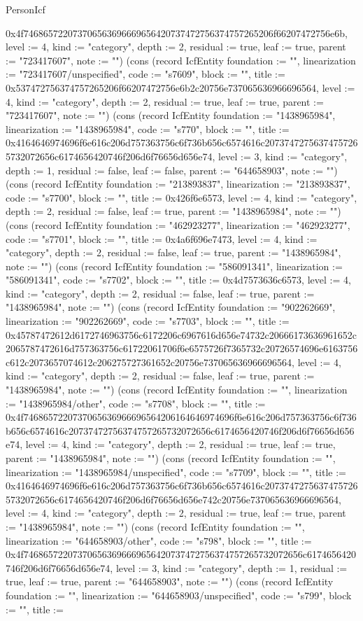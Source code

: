 \begin{lexlean}{PersonIcf}
\begin{semanticmodule}
{0x4f746865722073706563696669656420737472756374757265206f66207472756e6b, level := 4, kind := "category", depth := 2, residual := true, leaf := true, parent := "723417607", note := ""}) (cons (record IcfEntity {foundation := "", linearization := "723417607/unspecified", code := "s7609", block := "", title := 0x537472756374757265206f66207472756e6b2c20756e737065636966696564, level := 4, kind := "category", depth := 2, residual := true, leaf := true, parent := "723417607", note := ""}) (cons (record IcfEntity {foundation := "1438965984", linearization := "1438965984", code := "s770", block := "", title := 0x4164646974696f6e616c206d757363756c6f736b656c6574616c20737472756374757265732072656c6174656420746f206d6f76656d656e74, level := 3, kind := "category", depth := 1, residual := false, leaf := false, parent := "644658903", note := ""}) (cons (record IcfEntity {foundation := "213893837", linearization := "213893837", code := "s7700", block := "", title := 0x426f6e6573, level := 4, kind := "category", depth := 2, residual := false, leaf := true, parent := "1438965984", note := ""}) (cons (record IcfEntity {foundation := "462923277", linearization := "462923277", code := "s7701", block := "", title := 0x4a6f696e7473, level := 4, kind := "category", depth := 2, residual := false, leaf := true, parent := "1438965984", note := ""}) (cons (record IcfEntity {foundation := "586091341", linearization := "586091341", code := "s7702", block := "", title := 0x4d7573636c6573, level := 4, kind := "category", depth := 2, residual := false, leaf := true, parent := "1438965984", note := ""}) (cons (record IcfEntity {foundation := "902262669", linearization := "902262669", code := "s7703", block := "", title := 0x45787472612d6172746963756c6172206c6967616d656e74732c20666173636961652c2065787472616d757363756c61722061706f6e6575726f7365732c20726574696e6163756c612c2073657074612c206275727361652c20756e737065636966696564, level := 4, kind := "category", depth := 2, residual := false, leaf := true, parent := "1438965984", note := ""}) (cons (record IcfEntity {foundation := "", linearization := "1438965984/other", code := "s7708", block := "", title := 0x4f7468657220737065636966696564206164646974696f6e616c206d757363756c6f736b656c6574616c20737472756374757265732072656c6174656420746f206d6f76656d656e74, level := 4, kind := "category", depth := 2, residual := true, leaf := true, parent := "1438965984", note := ""}) (cons (record IcfEntity {foundation := "", linearization := "1438965984/unspecified", code := "s7709", block := "", title := 0x4164646974696f6e616c206d757363756c6f736b656c6574616c20737472756374757265732072656c6174656420746f206d6f76656d656e742c20756e737065636966696564, level := 4, kind := "category", depth := 2, residual := true, leaf := true, parent := "1438965984", note := ""}) (cons (record IcfEntity {foundation := "", linearization := "644658903/other", code := "s798", block := "", title := 0x4f746865722073706563696669656420737472756374757265732072656c6174656420746f206d6f76656d656e74, level := 3, kind := "category", depth := 1, residual := true, leaf := true, parent := "644658903", note := ""}) (cons (record IcfEntity {foundation := "", linearization := "644658903/unspecified", code := "s799", block := "", title := }
\end{semanticmodule}
\end{lexlean}
